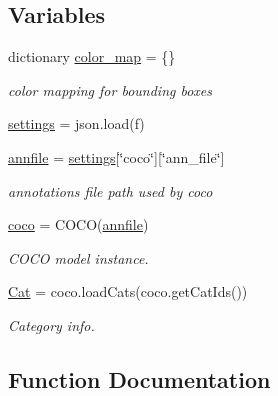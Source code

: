\subsection*{Variables}
\begin{DoxyCompactItemize}
\item 
dictionary \hyperlink{namespaceimgapp_1_1utils_aef6c0a613ef435057531c3e15d7ee228}{color\+\_\+map} = \{\}
\begin{DoxyCompactList}\small\item\em color mapping for bounding boxes \end{DoxyCompactList}\item 
\hyperlink{namespaceimgapp_1_1utils_ab8f7f09b0a834029cdce936a10744e75}{settings} = json.\+load(f)
\item 
\hyperlink{namespaceimgapp_1_1utils_a8e182872d7fd166b733945c31c6e75b0}{annfile} = \hyperlink{namespaceimgapp_1_1utils_ab8f7f09b0a834029cdce936a10744e75}{settings}\mbox{[}\char`\"{}coco\char`\"{}\mbox{]}\mbox{[}\char`\"{}ann\+\_\+file\char`\"{}\mbox{]}
\begin{DoxyCompactList}\small\item\em annotations file path used by coco \end{DoxyCompactList}\item 
\hyperlink{namespaceimgapp_1_1utils_a019aef0229f11d0fce25f09543158b1d}{coco} = C\+O\+CO(\hyperlink{namespaceimgapp_1_1utils_a8e182872d7fd166b733945c31c6e75b0}{annfile})
\begin{DoxyCompactList}\small\item\em C\+O\+CO model instance. \end{DoxyCompactList}\item 
\hyperlink{namespaceimgapp_1_1utils_a76721855ae19d74f938f4a234ccf2fa4}{Cat} = coco.\+load\+Cats(coco.\+get\+Cat\+Ids())
\begin{DoxyCompactList}\small\item\em Category info. \end{DoxyCompactList}\end{DoxyCompactItemize}


\subsection{Function Documentation}
\mbox{\label{namespaceimgapp_1_1utils_a7e2ce0fe32d261f7a8c57030029aa401}} 
